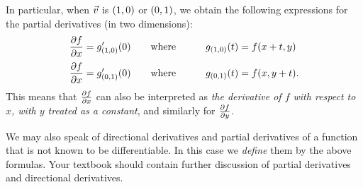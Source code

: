 \documentclass[12pt]{amsart}
\begin{document}
In particular, when $\vec{v}$ is $(1,0)$ or $(0,1)$, we obtain the following expressions for the partial derivatives (in two dimensions):
\begin{alignat*}{2}
  \frac{\partial f}{\partial x} &= g_{(1,0)}'(0) \qquad\text{where}\qquad & g_{(1,0)}(t) &= f(x+t,y)\\[2pt]
  \frac{\partial f}{\partial x} &= g_{(0,1)}'(0) \qquad\text{where}\qquad & g_{(0,1)}(t) &= f(x,y+t).
\end{alignat*}
This means that $\frac{\partial f}{\partial x}$ can also be interpreted as \emph{the derivative of $f$ with respect to $x$, with $y$ treated as a constant}, and similarly for $\frac{\partial f}{\partial y}$.

We may also speak of directional derivatives and partial derivatives of a function that is not known to be differentiable.
In this case we \emph{define} them by the above formulas.
Your textbook should contain further discussion of partial derivatives and directional derivatives.
\end{document}
